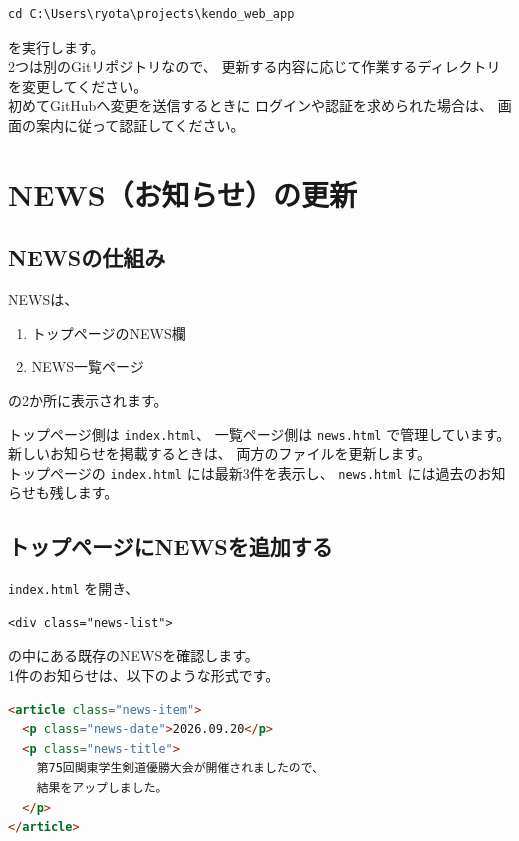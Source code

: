 \documentclass[a4paper,11pt]{ltjsarticle}
\begin{document}
\begin{lstlisting}
cd C:\Users\ryota\projects\kendo_web_app
\end{lstlisting}

を実行します。\\
2つは別のGitリポジトリなので、
更新する内容に応じて作業するディレクトリを変更してください。\\
初めてGitHubへ変更を送信するときに
ログインや認証を求められた場合は、
画面の案内に従って認証してください。


\section{NEWS（お知らせ）の更新}

\subsection{NEWSの仕組み}

NEWSは、

\begin{enumerate}
  \item トップページのNEWS欄
  \item NEWS一覧ページ
\end{enumerate}

の2か所に表示されます。

トップページ側は \texttt{index.html}、
一覧ページ側は \texttt{news.html} で管理しています。\\
新しいお知らせを掲載するときは、
両方のファイルを更新します。\\
トップページの \texttt{index.html} には最新3件を表示し、
\texttt{news.html} には過去のお知らせも残します。


\subsection{トップページにNEWSを追加する}

\texttt{index.html} を開き、

\begin{lstlisting}
<div class="news-list">
\end{lstlisting}

の中にある既存のNEWSを確認します。\\
1件のお知らせは、以下のような形式です。

\begin{lstlisting}[language=HTML]
<article class="news-item">
  <p class="news-date">2026.09.20</p>
  <p class="news-title">
    第75回関東学生剣道優勝大会が開催されましたので、
    結果をアップしました。
  </p>
</article>
\end{lstlisting}
\end{document}
